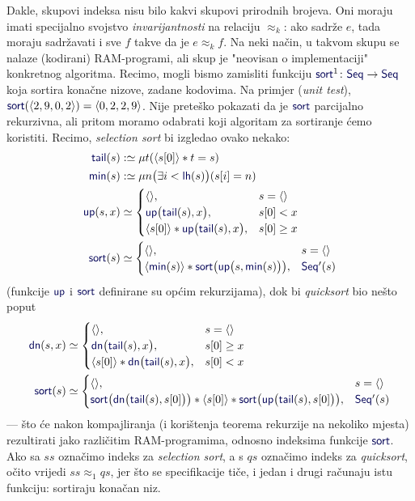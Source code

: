 Dakle, skupovi indeksa nisu bilo kakvi skupovi prirodnih brojeva. Oni moraju imati specijalno svojstvo \emph{invarijantnosti} na relaciju $\approx_k$: ako sadrže $e$, tada moraju sadržavati i sve $f$ takve da je $e\approx_k f$. Na neki način, u takvom skupu se nalaze (kodirani) RAM-programi, ali skup je "neovisan o implementaciji" konkretnog algoritma. Recimo, mogli bismo zamisliti funkciju $\f{sort}^1\colon\f{Seq}\to\f{Seq}$ koja sortira konačne nizove, zadane kodovima. Na primjer (\emph{unit test}), $\f{sort}(\kr{2,9,0,2})=\kr{0,2,2,9}$. Nije preteško pokazati da je $\f{sort}$ parcijalno rekurzivna, ali pritom moramo odabrati koji algoritam za sortiranje ćemo koristiti. Recimo, \emph{selection sort} bi izgledao ovako nekako:
\begin{align}
    \f{tail}(s)&:\simeq\mu t(\kr{s[0]}*t=s)\\
    \f{min}(s)&:\simeq\mu n\bigl(\exists i<\f{lh}(s)\bigr)(s[i]=n)\\
    \f{up}(s,x)&\simeq\begin{cases}
        \kr{},&s=\kr{}\\
        \f{up}\bigl(\f{tail}(s),x\bigr),&s[0]<x\\
        \kr{s[0]}*\f{up}\bigl(\f{tail}(s),x\bigr),&s[0]\ge x
    \end{cases}\\
    \f{sort}(s)&\simeq\begin{cases}
        \kr{},&s=\kr{}\\
        \kr{\f{min}(s)}*\f{sort}\bigl(\f{up}\bigl(s,\f{min}(s)\bigr)\bigr),&\f{Seq}'(s)
    \end{cases}
\end{align}
(funkcije $\f{up}$ i $\f{sort}$ definirane su općim rekurzijama), dok bi \emph{quicksort} bio nešto poput
\begin{align}
    \f{dn}(s,x)&\simeq\begin{cases}
        \kr{},&s=\kr{}\\
        \f{dn}\bigl(\f{tail}(s),x\bigr),&s[0]\ge x\\
        \kr{s[0]}*\f{dn}\bigl(\f{tail}(s),x\bigr),&s[0]<x
    \end{cases}\\
    \f{sort}(s)&\simeq\begin{cases}
        \kr{},&s=\kr{}\\
        \f{sort}\bigl(\f{dn}\bigl(\f{tail}(s),s[0]\bigr)\bigr)*\kr{s[0]}*\f{sort}\bigl(\f{up}\bigl(\f{tail}(s),s[0]\bigr)\bigr),&\f{Seq}'(s)
    \end{cases}
\end{align}
--- što će nakon kompajliranja (i korištenja teorema rekurzije na nekoliko mjesta) rezultirati jako različitim RAM-programima, odnosno indeksima funkcije $\f{sort}$. Ako sa $ss$ označimo indeks za \emph{selection sort}, a s $qs$ označimo indeks za \emph{quicksort}, očito vrijedi $ss\approx_1qs$, jer što se specifikacije tiče, i jedan i drugi računaju istu funkciju: sortiraju konačan niz.

